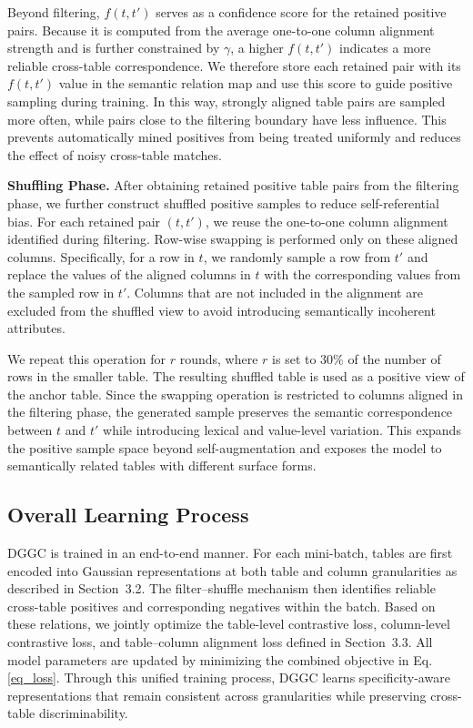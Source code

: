 Beyond filtering, \(f(t,t')\) serves as a confidence score for the retained
positive pairs. Because it is computed from the average one-to-one column
alignment strength and is further constrained by \(\gamma\), a higher
\(f(t,t')\) indicates a more reliable cross-table correspondence. We therefore
store each retained pair with its \(f(t,t')\) value in the semantic relation
map and use this score to guide positive sampling during training. In this
way, strongly aligned table pairs are sampled more often, while pairs close to
the filtering boundary have less influence. This prevents automatically mined
positives from being treated uniformly and reduces the effect of noisy
cross-table matches.

\noindent\textbf{Shuffling Phase.}
After obtaining retained positive table pairs from the filtering phase, we
further construct shuffled positive samples to reduce self-referential bias.
For each retained pair \((t,t')\), we reuse the one-to-one column alignment
identified during filtering. Row-wise swapping is performed only on these
aligned columns. Specifically, for a row in \(t\), we randomly sample a row
from \(t'\) and replace the values of the aligned columns in \(t\) with the
corresponding values from the sampled row in \(t'\). Columns that are not
included in the alignment are excluded from the shuffled view to avoid
introducing semantically incoherent attributes.

We repeat this operation for \(r\) rounds, where \(r\) is set to \(30\%\) of
the number of rows in the smaller table. The resulting shuffled table is used
as a positive view of the anchor table. Since the swapping operation is
restricted to columns aligned in the filtering phase, the generated sample
preserves the semantic correspondence between \(t\) and \(t'\) while introducing
lexical and value-level variation. This expands the positive sample space
beyond self-augmentation and exposes the model to semantically related tables
with different surface forms.

\subsection{Overall Learning Process}
\label{sub_sec_over}
DGGC is trained in an end-to-end manner. 
For each mini-batch, tables are first encoded into Gaussian representations at both table and column granularities as described in Section~3.2. 
The filter–shuffle mechanism then identifies reliable cross-table positives and corresponding negatives within the batch. 
Based on these relations, we jointly optimize the table-level contrastive loss, column-level contrastive loss, and table–column alignment loss defined in Section~3.3. 
All model parameters are updated by minimizing the combined objective in Eq. \eqref{eq_loss}. Through this unified training process, DGGC learns specificity-aware representations that remain consistent across granularities while preserving cross-table discriminability.


